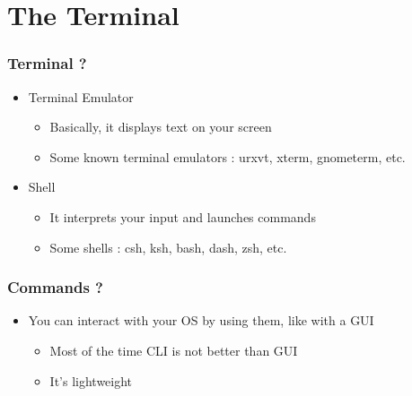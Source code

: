 \section{The Terminal}
\begin{frame}
        \frametitle{Terminal ?}
	\begin{itemize}
		\item Terminal Emulator
		\begin{itemize}
			\item Basically, it displays text on your screen
			\item Some known terminal emulators : urxvt, xterm, gnometerm, etc.
		\end{itemize}
		\item Shell
		\begin{itemize}
			\item It interprets your input and launches commands
			\item Some shells : csh, ksh, bash, dash, zsh, etc.
		\end{itemize}
	\end{itemize}
\end{frame}
\begin{frame}
    \frametitle{Commands ?}
    \begin{itemize}
        \item You can interact with your OS by using them, like with a GUI
            \begin{itemize}
                \item Most of the time CLI is not better than GUI
                \item It's lightweight
            \end{itemize}
    \end{itemize}
\end{frame}
